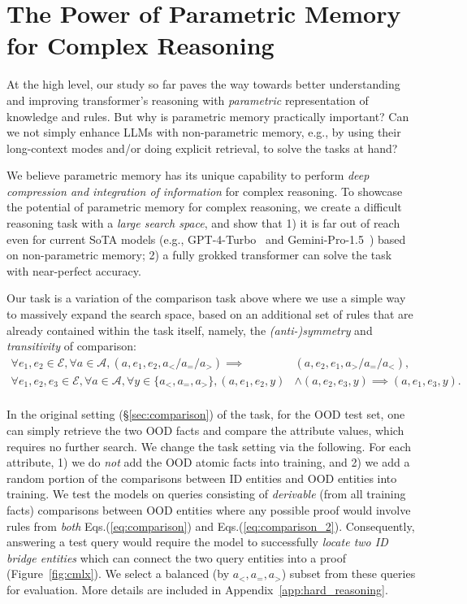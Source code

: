 \section{The Power of Parametric Memory for Complex Reasoning}

\label{sec:hard_reasoning}

At the high level, our study so far paves the way towards better understanding and improving transformer's reasoning with \textit{parametric} representation of knowledge and rules. But why is parametric memory practically important? Can we not simply enhance LLMs with non-parametric memory, e.g., by using their long-context modes and/or doing explicit retrieval, to solve the tasks at hand?

We believe parametric memory has its unique capability to perform \textit{deep compression and integration of information} for complex reasoning.
To showcase the potential of parametric memory for complex reasoning, we create a difficult reasoning task with a \textit{large search space}, and show that 1) it is far out of reach even for current SoTA models (e.g., GPT-4-Turbo~\citep{openai_devday_2023} and Gemini-Pro-1.5~\citep{google2024gemini}) based on non-parametric memory; 2) a fully grokked transformer can solve the task with near-perfect accuracy.

Our task is a variation of the comparison task above where we use a simple way to massively expand the search space, based on an additional set of rules that are already contained within the task itself, namely, the \textit{(anti-)symmetry} and \textit{transitivity} of comparison:
\begin{equation}
\label{eq:comparison_2}
\begin{aligned}
    \forall e_1,e_2 \in \mathcal{E}, \forall a\in \mathcal{A}, (a, e_1, e_2, a_</a_=/a_>)  \implies& (a, e_2, e_1, a_>/a_=/a_<), \\
    \forall e_1,e_2,e_3 \in \mathcal{E}, \forall a\in \mathcal{A}, \forall y\in \{a_<, a_=, a_>\}, (a, e_1, e_2, y)  & \land (a, e_2, e_3, y) \implies (a, e_1, e_3, y).\\
\end{aligned}
\end{equation}

In the original setting (\S\ref{sec:comparison}) of the task, for the OOD test set, one can simply retrieve the two OOD facts and compare the attribute values, which requires no further search. We change the task setting via the following. For each attribute, 1) we do \textit{not} add the OOD atomic facts into training, and 2) we add a random portion of the comparisons between ID entities and OOD entities into training. We test the models on queries consisting of \textit{derivable} (from all training facts) comparisons between OOD entities where any possible proof would involve rules from \textit{both} Eqs.(\ref{eq:comparison}) and Eqs.(\ref{eq:comparison_2}). Consequently, answering a test query would require the model to successfully \textit{locate two ID bridge entities} which can connect the two query entities into a proof (Figure~\ref{fig:cmlx}). We select a balanced (by $a_<,a_=,a_>$) subset from these queries for evaluation. More details are included in Appendix~\ref{app:hard_reasoning}.

